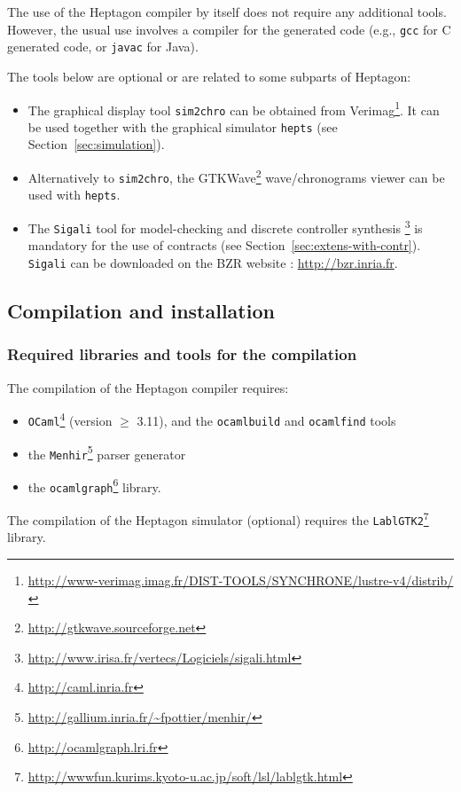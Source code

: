 \documentclass[a4paper]{article}
\begin{document}
The use of the Heptagon compiler by itself does not require any additional
tools. However, the usual use involves a compiler for the generated code (e.g.,
\texttt{gcc} for C generated code, or \texttt{javac} for Java).

The tools below are optional or are related to some subparts of Heptagon:
\begin{itemize}
\item The graphical display tool \texttt{sim2chro} can be obtained from
  Verimag\footnote{\url{http://www-verimag.imag.fr/DIST-TOOLS/SYNCHRONE/lustre-v4/distrib/}}. It
  can be used together with the graphical simulator \texttt{hepts} (see
  Section~\ref{sec:simulation}).
\item Alternatively to \texttt{sim2chro}, the
  GTKWave\footnote{\url{http://gtkwave.sourceforge.net}} wave/chronograms viewer
  can be used with \texttt{hepts}.
\item The \texttt{Sigali} tool for model-checking and discrete controller
  synthesis \cite{sigali}
  \footnote{\url{http://www.irisa.fr/vertecs/Logiciels/sigali.html}} is
  mandatory for the use of contracts (see
  Section~\ref{sec:extens-with-contr}). \texttt{Sigali} can be downloaded on the
  BZR website : \url{http://bzr.inria.fr}.
\end{itemize}

\subsection{Compilation and installation}
\label{sec:comp-inst}

\subsubsection{Required libraries and tools for the compilation}
\label{sec:requ-libr-tools}

The compilation of the Heptagon compiler requires:
\begin{itemize}
\item \texttt{OCaml}\footnote{\url{http://caml.inria.fr}} (version $\geq$
  3.11), and the \texttt{ocamlbuild} and \texttt{ocamlfind} tools
\item the \texttt{Menhir}\footnote{\url{http://gallium.inria.fr/~fpottier/menhir/}} parser generator
\item the \texttt{ocamlgraph}\footnote{\url{http://ocamlgraph.lri.fr}} library.
\end{itemize}

The compilation of the Heptagon simulator (optional) requires the
\texttt{LablGTK2}\footnote{\url{http://wwwfun.kurims.kyoto-u.ac.jp/soft/lsl/lablgtk.html}}
library.
\end{document}
